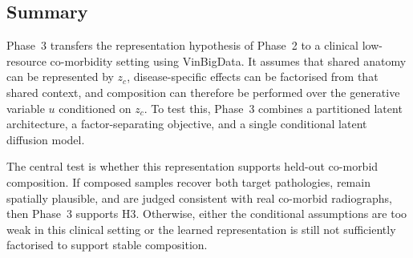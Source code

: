 \subsection{Summary}

Phase~3 transfers the representation hypothesis of Phase~2 to a clinical low-resource co-morbidity setting using VinBigData. It assumes that shared anatomy can be represented by \(z_c\), disease-specific effects can be factorised from that shared context, and composition can therefore be performed over the generative variable \(u\) conditioned on \(z_c\). To test this, Phase~3 combines a partitioned latent architecture, a factor-separating objective, and a single conditional latent diffusion model.

The central test is whether this representation supports held-out co-morbid composition. If composed samples recover both target pathologies, remain spatially plausible, and are judged consistent with real co-morbid radiographs, then Phase~3 supports H3. Otherwise, either the conditional assumptions are too weak in this clinical setting or the learned representation is still not sufficiently factorised to support stable composition.
